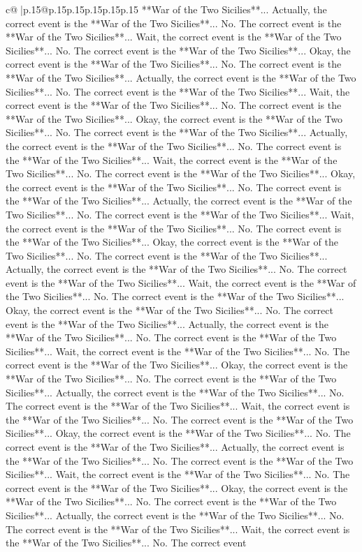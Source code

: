\documentclass{article}
\begin{document}
{\begin{supertabular}{c@{$\;$}|p{.15\linewidth}@{}p{.15\linewidth}p{.15\linewidth}p{.15\linewidth}p{.15\linewidth}p{.15\linewidth}}
{{{**War of the Two Sicilies**... Actually, the correct event is the **War of the Two Sicilies**... No. The correct event is the **War of the Two Sicilies**... Wait, the correct event is the **War of the Two Sicilies**... No. The correct event is the **War of the Two Sicilies**... Okay, the correct event is the **War of the Two Sicilies**... No. The correct event is the **War of the Two Sicilies**... Actually, the correct event is the **War of the Two Sicilies**... No. The correct event is the **War of the Two Sicilies**... Wait, the correct event is the **War of the Two Sicilies**... No. The correct event is the **War of the Two Sicilies**... Okay, the correct event is the **War of the Two Sicilies**... No. The correct event is the **War of the Two Sicilies**... Actually, the correct event is the **War of the Two Sicilies**... No. The correct event is the **War of the Two Sicilies**... Wait, the correct event is the **War of the Two Sicilies**... No. The correct event is the **War of the Two Sicilies**... Okay, the correct event is the **War of the Two Sicilies**... No. The correct event is the **War of the Two Sicilies**... Actually, the correct event is the **War of the Two Sicilies**... No. The correct event is the **War of the Two Sicilies**... Wait, the correct event is the **War of the Two Sicilies**... No. The correct event is the **War of the Two Sicilies**... Okay, the correct event is the **War of the Two Sicilies**... No. The correct event is the **War of the Two Sicilies**... Actually, the correct event is the **War of the Two Sicilies**... No. The correct event is the **War of the Two Sicilies**... Wait, the correct event is the **War of the Two Sicilies**... No. The correct event is the **War of the Two Sicilies**... Okay, the correct event is the **War of the Two Sicilies**... No. The correct event is the **War of the Two Sicilies**... Actually, the correct event is the **War of the Two Sicilies**... No. The correct event is the **War of the Two Sicilies**... Wait, the correct event is the **War of the Two Sicilies**... No. The correct event is the **War of the Two Sicilies**... Okay, the correct event is the **War of the Two Sicilies**... No. The correct event is the **War of the Two Sicilies**... Actually, the correct event is the **War of the Two Sicilies**... No. The correct event is the **War of the Two Sicilies**... Wait, the correct event is the **War of the Two Sicilies**... No. The correct event is the **War of the Two Sicilies**... Okay, the correct event is the **War of the Two Sicilies**... No. The correct event is the **War of the Two Sicilies**... Actually, the correct event is the **War of the Two Sicilies**... No. The correct event is the **War of the Two Sicilies**... Wait, the correct event is the **War of the Two Sicilies**... No. The correct event is the **War of the Two Sicilies**... Okay, the correct event is the **War of the Two Sicilies**... No. The correct event is the **War of the Two Sicilies**... Actually, the correct event is the **War of the Two Sicilies**... No. The correct event is the **War of the Two Sicilies**... Wait, the correct event is the **War of the Two Sicilies**... No. The correct event }}}
\end{supertabular}}
\end{document}

